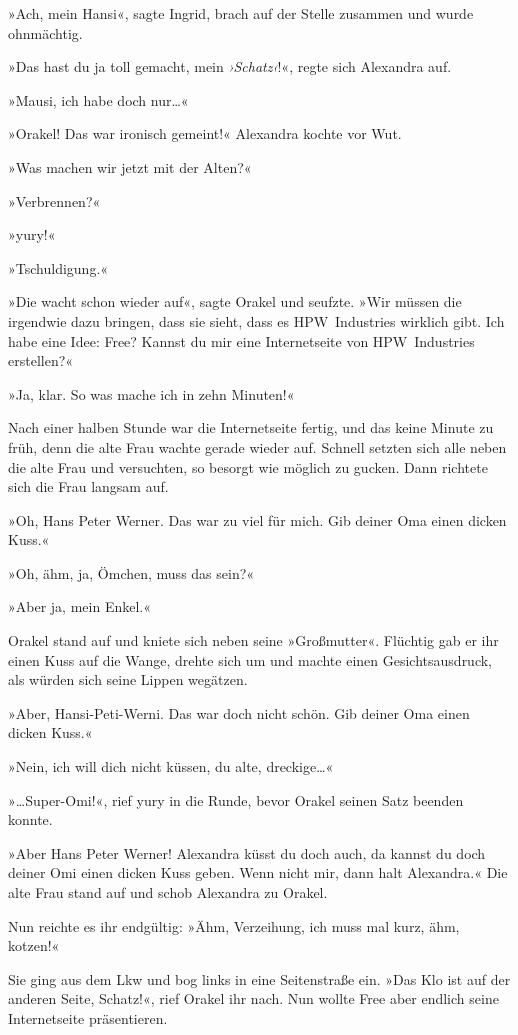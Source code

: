 »Ach, mein Hansi«, sagte Ingrid, brach auf der Stelle zusammen und wurde ohnmächtig.

»Das hast du ja toll gemacht, mein \textit{›Schatz‹}!«, regte sich Alexandra auf.

»Mausi, ich habe doch nur…«

»Orakel! Das war ironisch gemeint!« Alexandra kochte vor Wut.

»Was machen wir jetzt mit der Alten?«

»Verbrennen?«

»yury!«

»Tschuldigung.«

»Die wacht schon wieder auf«, sagte Orakel und seufzte. »Wir müssen die irgendwie dazu bringen, dass sie sieht, dass es HPW~Industries wirklich gibt. Ich habe eine Idee: Free? Kannst du mir eine Internetseite von HPW~Industries erstellen?«

»Ja, klar. So was mache ich in zehn Minuten!«

Nach einer halben Stunde war die Internetseite fertig, und das keine Minute zu früh, denn die alte Frau wachte gerade wieder auf. Schnell setzten sich alle neben die alte Frau und versuchten, so besorgt wie möglich zu gucken. Dann richtete sich die Frau langsam auf.

»Oh, Hans Peter Werner. Das war zu viel für mich. Gib deiner Oma einen dicken Kuss.«

»Oh, ähm, ja, Ömchen, muss das sein?«

»Aber ja, mein Enkel.«

Orakel stand auf und kniete sich neben seine »Großmutter«. Flüchtig gab er ihr einen Kuss auf die Wange, drehte sich um und machte einen Gesichtsausdruck, als würden sich seine Lippen wegätzen.

»Aber, Hansi-Peti-Werni. Das war doch nicht schön. Gib deiner Oma einen dicken Kuss.«

»Nein, ich will dich nicht küssen, du alte, dreckige…«

»…Super-Omi!«, rief yury in die Runde, bevor Orakel seinen Satz beenden konnte.

»Aber Hans Peter Werner! Alexandra küsst du doch auch, da kannst du doch deiner Omi einen dicken Kuss geben. Wenn nicht mir, dann halt Alexandra.« Die alte Frau stand auf und schob Alexandra zu Orakel.

Nun reichte es ihr endgültig: »Ähm, Verzeihung, ich muss mal kurz, ähm, kotzen!«

Sie ging aus dem Lkw und bog links in eine Seitenstraße ein. »Das Klo ist auf der anderen Seite, Schatz!«, rief Orakel ihr nach. Nun wollte Free aber endlich seine Internetseite präsentieren.

